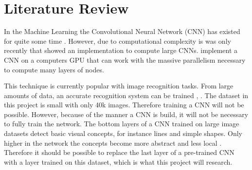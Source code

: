\documentclass[a4paper, 11pt]{article}
\begin{document}
\section{Literature Review}
In the Machine Learning the Convolutional Neural Network (CNN) has existed for quite some time \citep{fukushima1980neocognitron}. However, due to computational complexity is was only recently that \citet{krizhevsky2012imagenet} showed an implementation to compute large CNNs.
\citeauthor{krizhevsky2012imagenet} implement a CNN on a computers GPU that can work with the massive parallelism necessary to compute many layers of nodes.

This technique is currently popular with image recognition tasks. From large amounts of data, an accurate recognition system can be trained \citep{girshick2014rich}, \citep{razavian2014cnn}.
The dataset in this project is small with only 40k images. Therefore training a CNN will not be possible. However, because of the manner a CNN is build, it will not be necessary to fully train the network. The bottom layers of a CNN trained on large image datasets detect basic visual concepts, for instance lines and simple shapes. Only higher in the network the concepts become more abstract and less local \citep{zeiler2014visualizing}.
Therefore it should be possible to replace the last layer of a pre-trained CNN with a layer trained on this dataset, which is what this project will research.


\end{document}
